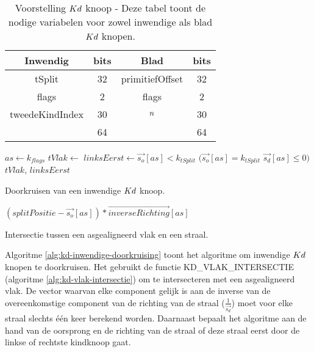 \begin{table}
    \centering
    \begin{tabular}{@{}|c|c|c|c|@{}} \toprule      
    Inwendig & bits & Blad & bits \\ \midrule
    tSplit & 32 & primitiefOffset & 32 \\
    flags  & 2  &  flags   & 2    \\
    tweedeKindIndex & 30 & $n$ & 30 \\ \hline \hline
    & 64 & & 64    \\ \bottomrule
    \end{tabular}
    \caption[Voorstelling $\symKd$ knoop]{Voorstelling $\symKd$ knoop - \small Deze tabel toont de nodige variabelen voor zowel inwendige als blad $\symKd$ knopen.}
    \label{tab:voorstelling-kd-knoop}
\end{table}            
\begin{dutchalgorithm}
    \begin{algorithmic}       
            \State $as \gets k_{flags}$
            \State $tVlak \gets $ 
            \State $linksEerst \gets \vec{s_o}[as] < k_{tSplit}$ \Or $(\vec{s_o}[as] = k_{tSplit}$ \And $\vec{s_d}[as] \leq 0)$
            \State \Return $tVlak$, $linksEerst$
        \EndFunction
    \end{algorithmic}
    \caption{Doorkruisen van een inwendige $\symKd$ knoop.}
    \label{alg:kd-inwendige-doorkruising}
\end{dutchalgorithm}
\begin{dutchalgorithm}
    \begin{algorithmic}       
            \State \Return $(splitPositie - \vec{s_o}[as]) * \vec{inverseRichting}[as]$
        \EndFunction
    \end{algorithmic}
    \caption{Intersectie tussen een asgealigneerd vlak en een straal.}
    \label{alg:kd-vlak-intersectie}
\end{dutchalgorithm}
Algoritme \ref{alg:kd-inwendige-doorkruising} toont het algoritme om inwendige $\symKd$ knopen te doorkruisen.
Het gebruikt de functie KD\_VLAK\_INTERSECTIE (algoritme \ref{alg:kd-vlak-intersectie}) om te intersecteren met een asgealigneerd vlak.
De vector waarvan elke component gelijk is aan de inverse van de overeenkomstige component van de richting van de straal ($\frac{1}{\vec{s_d}}$) moet voor elke straal slechts één keer berekend worden.
Daarnaast bepaalt het algoritme aan de hand van de oorsprong en de richting van de straal of deze straal eerst door de linkse of rechtste kindknoop gaat.
\\


